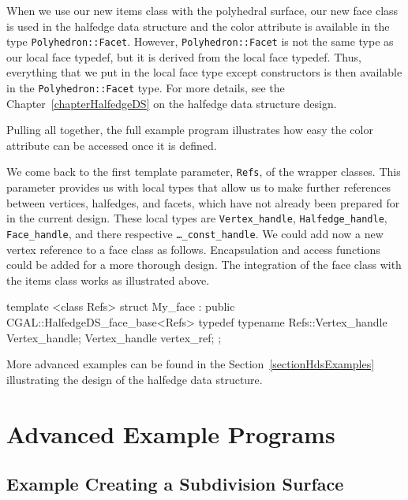 When we use our new items class with the polyhedral surface, our new
face class is used in the halfedge data structure and the color
attribute is available in the type \texttt{Polyhedron::Facet}. However,
\texttt{Polyhedron::Facet} is not the same type as our local face 
typedef, but it is derived from the local face typedef. Thus,
everything that we put in the local face type except constructors is then
available in the \texttt{Polyhedron::Facet} type. For more details, see 
the Chapter~\ref{chapterHalfedgeDS} on the halfedge data structure design.

Pulling all together, the full example program illustrates how easy
the color attribute can be accessed once it is defined.


We come back to the first template parameter, \texttt{Refs}, of the
wrapper classes. This parameter provides us with local types that
allow us to make further references between vertices, halfedges, and
facets, which have not already been prepared for in the current
design. These local types are \texttt{Vertex\_handle},
\texttt{Halfedge\_handle}, \texttt{Face\_handle}, and there respective
\texttt{\ldots\_const\_handle}. We could add now a new vertex reference to a
face class as follows. Encapsulation and access functions could be
added for a more thorough design. The integration of the face class
with the items class works as illustrated above.

\begin{ccExampleCode}
template <class Refs>
struct My_face : public CGAL::HalfedgeDS_face_base<Refs> {
    typedef typename Refs::Vertex_handle Vertex_handle;
    Vertex_handle vertex_ref;
};
\end{ccExampleCode}

More advanced examples can be found in the
Section~\ref{sectionHdsExamples} illustrating the design of the
halfedge data structure.


\section{Advanced Example Programs}
\label{sectionPolyAdvanced}

\subsection{Example Creating a Subdivision Surface}

